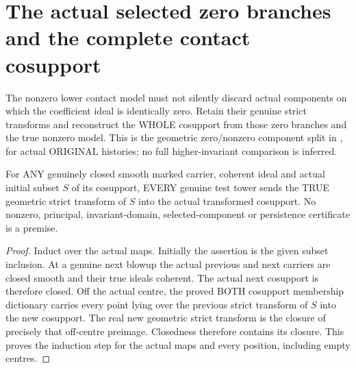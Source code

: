 \section{The actual selected zero branches and the complete contact cosupport}

The nonzero lower contact model must not silently discard actual components
on which the coefficient ideal is identically zero. Retain their genuine
strict transforms and reconstruct the WHOLE cosupport from those zero
branches and the true nonzero model. This is the geometric zero/nonzero
component split in \cite[Step I, Case A]{bierstone-milman08-functoriality},
for actual ORIGINAL histories; no full higher-invariant comparison is inferred.

\begin{theorem}
\label{hir:actual-initial-cosupport-subset-strict-persistence}
\leanok
For ANY genuinely closed smooth marked carrier, coherent ideal and actual
initial subset $S$ of its cosupport, EVERY genuine test tower sends the
TRUE geometric strict transform of $S$ into the actual transformed cosupport.
No nonzero, principal, invariant-domain, selected-component or persistence
certificate is a premise.
\end{theorem}
\begin{proof}
Induct over the actual maps. Initially the assertion is the given subset
inclusion. At a genuine next blowup the actual previous and next carriers
are closed smooth and their true ideals coherent. The actual next
cosupport is therefore closed. Off the actual centre, the proved BOTH
cosupport membership dictionary carries every point lying over the previous
strict transform of $S$ into the new cosupport. The real new geometric
strict transform is the closure of precisely that off-centre preimage.
Closedness therefore contains its closure. This proves the induction step
for the actual maps and every position, including empty centres.
\end{proof}


